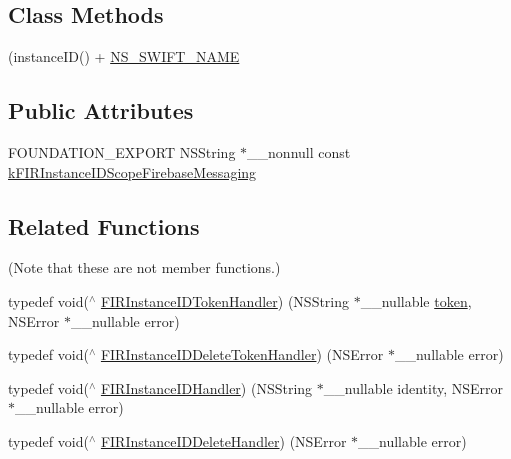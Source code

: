\subsection*{Class Methods}
\begin{DoxyCompactItemize}
\item 
(instance\+I\+D() + \hyperlink{interface_f_i_r_instance_i_d_a8bbb19df485d7968f771d23d91f017d0}{N\+S\+\_\+\+S\+W\+I\+F\+T\+\_\+\+N\+A\+M\+E}
\end{DoxyCompactItemize}
\subsection*{Public Attributes}
\begin{DoxyCompactItemize}
\item 
F\+O\+U\+N\+D\+A\+T\+I\+O\+N\+\_\+\+E\+X\+P\+O\+R\+T N\+S\+String $\ast$\+\_\+\+\_\+nonnull const \hyperlink{interface_f_i_r_instance_i_d_a458ffe70dc5bb35b35a38696893840fd}{k\+F\+I\+R\+Instance\+I\+D\+Scope\+Firebase\+Messaging}
\end{DoxyCompactItemize}
\subsection*{Related Functions}
(Note that these are not member functions.) \begin{DoxyCompactItemize}
\item 
typedef void($^\wedge$ \hyperlink{interface_f_i_r_instance_i_d_a47838dd5b1538db6035b93ce8be1a63a}{F\+I\+R\+Instance\+I\+D\+Token\+Handler}) (N\+S\+String $\ast$\+\_\+\+\_\+nullable \hyperlink{interface_f_i_r_instance_i_d_a24c0ad9b49c659939163ebdcadabb91b}{token}, N\+S\+Error $\ast$\+\_\+\+\_\+nullable error)
\item 
typedef void($^\wedge$ \hyperlink{interface_f_i_r_instance_i_d_a511dc978f832ebb91d45a67c66b5873c}{F\+I\+R\+Instance\+I\+D\+Delete\+Token\+Handler}) (N\+S\+Error $\ast$\+\_\+\+\_\+nullable error)
\item 
typedef void($^\wedge$ \hyperlink{interface_f_i_r_instance_i_d_af36e2c9155abb05a1a05092d93322229}{F\+I\+R\+Instance\+I\+D\+Handler}) (N\+S\+String $\ast$\+\_\+\+\_\+nullable identity, N\+S\+Error $\ast$\+\_\+\+\_\+nullable error)
\item 
typedef void($^\wedge$ \hyperlink{interface_f_i_r_instance_i_d_ab51fbd359aa730c0d3e596b7f122f9d2}{F\+I\+R\+Instance\+I\+D\+Delete\+Handler}) (N\+S\+Error $\ast$\+\_\+\+\_\+nullable error)
\end{DoxyCompactItemize}


